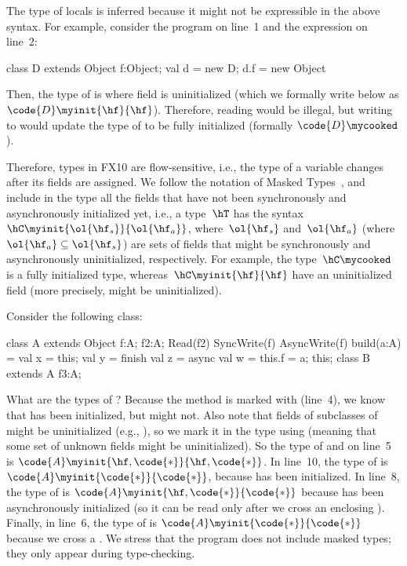 \documentclass[a4paper]{article}
\begin{document}
The type of  locals is inferred because it might not be expressible in the above syntax.
For example, consider the program on line~1 and the expression on line~2:
\begin{xten}
class D extends Object { f:Object; }
val d = new D; d.f = new Object
\end{xten}
Then, the type of  is  where field  is uninitialized
    (which we formally write below as $\code{D}\myinit{\hf}{\hf}$).
Therefore, reading  would be illegal, but writing to  would update the type of 
    to be fully initialized (formally $\code{D}\mycooked$).

Therefore, types in FX10 are flow-sensitive, i.e., the type of a variable changes after its fields are assigned.
We follow the notation of Masked Types~\cite{XinQi:2009}, and include in the type all the
    fields that have not been synchronously and asynchronously initialized yet,
    i.e., a type~$\hT$ has the syntax~$\hC\myinit{\ol{\hf_s}}{\ol{\hf_a}}$,
        where~$\ol{\hf_s}$ and~$\ol{\hf_a}$ (where~$\ol{\hf_a} \subseteq \ol{\hf_s}$)
        are sets of fields that might
        be synchronously and asynchronously uninitialized, respectively.
For example, the type~$\hC\mycooked$ is a fully initialized type,
    whereas~$\hC\myinit{\hf}{\hf}$ have an uninitialized field \hf
    (more precisely, \hf might be uninitialized).

Consider the following class:
\begin{xten}
class A extends Object {
  f:A;
  f2:A;
  Read(f2) SyncWrite(f) AsyncWrite(f) build(a:A) =
    val x = this;
    val y =
      finish
        val z =
          async
            val w = this.f = a;
          this;
}
class B extends A { f3:A; }
\end{xten}
What are the types of ?
Because the method is marked with  (line~4),
    we know that  has been initialized,
    but  might not.
Also note that fields of subclasses of  might be uninitialized (e.g., ),
    so we mark it in the type using \code{*} (meaning that some set of unknown fields might be uninitialized).
So the type of  and \this on line~5 is
    $\code{A}\myinit{\hf,\code{*}}{\hf,\code{*}}$.
In line~10, the type of  is
    $\code{A}\myinit{\code{*}}{\code{*}}$,
    because  has been initialized.
In line~8, the type of  is
    $\code{A}\myinit{\hf,\code{*}}{\code{*}}$
    because  has been asynchronously initialized
    (so it can be read only after we cross an enclosing \finish).
Finally, in line~6, the type of  is
    $\code{A}\myinit{\code{*}}{\code{*}}$
    because we cross a \finish.
We stress that the program does not include masked types;
    they only appear during type-checking.
\end{document}
